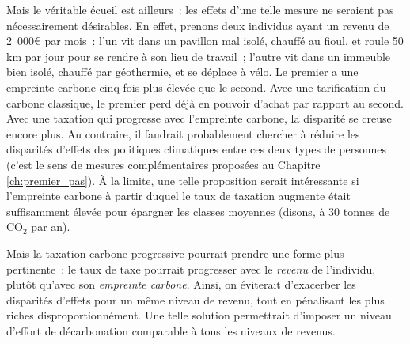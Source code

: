 \documentclass[a5paper,french]{memoir}
\begin{document}
Mais le véritable écueil est ailleurs~: les effets d'une telle mesure ne seraient pas nécessairement désirables. En effet, prenons deux individus ayant un revenu de 2~000\euro{} par mois~: l'un vit dans un pavillon mal isolé, chauffé au fioul, et roule 50 km par jour pour se rendre à son lieu de travail~; l'autre vit dans un immeuble bien isolé, chauffé par géothermie, et se déplace à vélo. Le premier a une empreinte carbone cinq fois plus élevée que le second. Avec une tarification du carbone classique, le premier perd déjà en pouvoir d'achat par rapport au second. Avec une taxation qui progresse avec l'empreinte carbone, la disparité se creuse encore plus. Au contraire, il faudrait probablement chercher à réduire les disparités d'effets des politiques climatiques entre ces deux types de personnes (c'est le sens de mesures complémentaires proposées au Chapitre \ref{ch:premier_pas}). À la limite, une telle proposition serait intéressante si l'empreinte carbone à partir duquel le taux de taxation augmente était suffisamment élevée pour épargner les classes moyennes (disons, à 30 tonnes de CO$_\text{2}$ par an). %

Mais la taxation carbone progressive pourrait prendre une forme plus pertinente~: le taux de taxe pourrait progresser avec le \textit{revenu} de l'individu, plutôt qu'avec son \textit{empreinte carbone}. Ainsi, on éviterait d'exacerber les disparités d'effets pour un même niveau de revenu, tout en pénalisant les plus riches disproportionnément. Une telle solution permettrait d'imposer un niveau d'effort de décarbonation comparable à tous les niveaux de revenus. 
\end{document}

